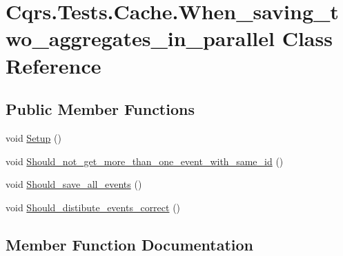 \hypertarget{classCqrs_1_1Tests_1_1Cache_1_1When__saving__two__aggregates__in__parallel}{}\section{Cqrs.\+Tests.\+Cache.\+When\+\_\+saving\+\_\+two\+\_\+aggregates\+\_\+in\+\_\+parallel Class Reference}
\label{classCqrs_1_1Tests_1_1Cache_1_1When__saving__two__aggregates__in__parallel}
\subsection*{Public Member Functions}
\begin{DoxyCompactItemize}
\item 
void \hyperlink{classCqrs_1_1Tests_1_1Cache_1_1When__saving__two__aggregates__in__parallel_a85461450e744a14af6f39fd3fd1d97c2}{Setup} ()
\item 
void \hyperlink{classCqrs_1_1Tests_1_1Cache_1_1When__saving__two__aggregates__in__parallel_a88c5e658e349c7687a028b2c7b60e514}{Should\+\_\+not\+\_\+get\+\_\+more\+\_\+than\+\_\+one\+\_\+event\+\_\+with\+\_\+same\+\_\+id} ()
\item 
void \hyperlink{classCqrs_1_1Tests_1_1Cache_1_1When__saving__two__aggregates__in__parallel_ae57d21af07695d19afd23307ead361f7}{Should\+\_\+save\+\_\+all\+\_\+events} ()
\item 
void \hyperlink{classCqrs_1_1Tests_1_1Cache_1_1When__saving__two__aggregates__in__parallel_aae0537250e2e48c70079e4b23ec4a602}{Should\+\_\+distibute\+\_\+events\+\_\+correct} ()
\end{DoxyCompactItemize}


\subsection{Member Function Documentation}
\mbox{\label{classCqrs_1_1Tests_1_1Cache_1_1When__saving__two__aggregates__in__parallel_a85461450e744a14af6f39fd3fd1d97c2}} 

